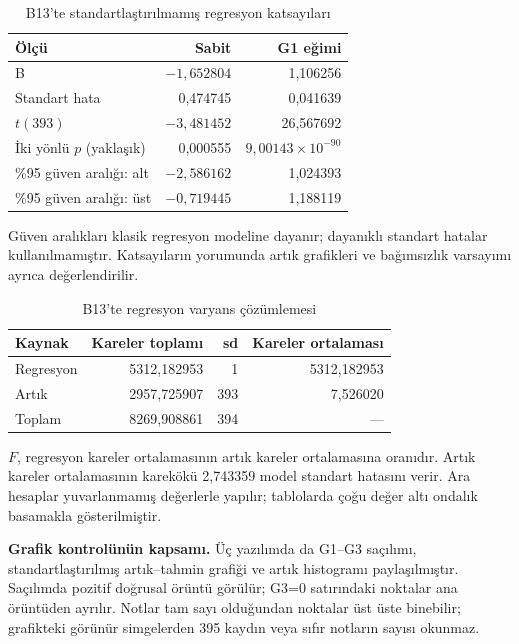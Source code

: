 \begin{table}[H]
\centering
\caption{B13'te standartlaştırılmamış regresyon katsayıları}
\label{tab:b13-dogrulanmis-katsayi}
\begin{tabular}{@{}lrr@{}}
\toprule
Ölçü & Sabit & G1 eğimi \\
\midrule
B & $-1{,}652804$ & 1,106256 \\
Standart hata & 0,474745 & 0,041639 \\
$t(393)$ & $-3{,}481452$ & 26,567692 \\
İki yönlü $p$ (yaklaşık) & 0,000555 & $9{,}00143\times10^{-90}$ \\
\%95 güven aralığı: alt & $-2{,}586162$ & 1,024393 \\
\%95 güven aralığı: üst & $-0{,}719445$ & 1,188119 \\
\bottomrule
\end{tabular}
\par\smallskip
{\footnotesize Güven aralıkları klasik regresyon modeline dayanır;
dayanıklı standart hatalar kullanılmamıştır. Katsayıların yorumunda
artık grafikleri ve bağımsızlık varsayımı ayrıca değerlendirilir.\par}
\end{table}

\begin{table}[H]
\centering
\caption{B13'te regresyon varyans çözümlemesi}
\label{tab:b13-dogrulanmis-anova}
\begin{tabular}{@{}lrrr@{}}
\toprule
Kaynak & Kareler toplamı & sd & Kareler ortalaması \\
\midrule
Regresyon & 5312,182953 & 1 & 5312,182953 \\
Artık & 2957,725907 & 393 & 7,526020 \\
Toplam & 8269,908861 & 394 & --- \\
\bottomrule
\end{tabular}
\par\smallskip
{\footnotesize $F$, regresyon kareler ortalamasının artık kareler
ortalamasına oranıdır. Artık kareler ortalamasının karekökü 2,743359
model standart hatasını verir. Ara hesaplar yuvarlanmamış değerlerle
yapılır; tablolarda çoğu değer altı ondalık basamakla gösterilmiştir.\par}
\end{table}

\textbf{Grafik kontrolünün kapsamı.} Üç yazılımda da G1--G3
saçılımı, standartlaştırılmış artık--tahmin grafiği ve artık
histogramı paylaşılmıştır. Saçılımda pozitif doğrusal örüntü
görülür; G3=0 satırındaki noktalar ana örüntüden ayrılır.
Notlar tam sayı olduğundan noktalar üst üste binebilir; grafikteki
görünür simgelerden 395 kaydın veya sıfır notların sayısı okunmaz.

